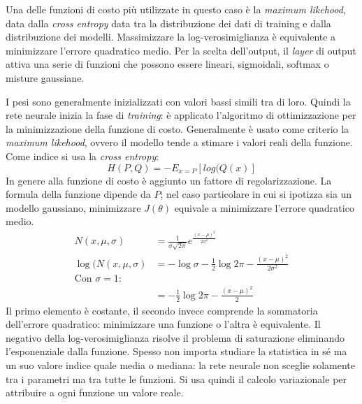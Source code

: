 \documentclass[11pt, a4page]{article}
\begin{document}
Una delle funzioni di costo più utilizzate in questo caso è la \textit{maximum likehood}, data dalla \textit{cross entropy} data tra la distribuzione dei dati di training e dalla distribuzione dei modelli.
Massimizzare la log-verosimiglianza è equivalente a minimizzare l'errore quadratico medio.
Per la scelta dell'output, il \textit{layer} di output attiva una serie di funzioni che possono essere lineari, sigmoidali, softmax o misture gaussiane.

I pesi sono generalmente inizializzati con valori bassi simili tra di loro.
Quindi la rete neurale inizia la fase di \textit{training}: è applicato l'algoritmo di ottimizzazione per la minimizzazione della funzione di costo.
Generalmente è usato come criterio la \textit{maximum likehood}, ovvero il modello tende a stimare i valori reali della funzione.
Come indice si usa la \textit{cross entropy}:
\begin{equation*}
  H(P, Q) = -E_{x=P}[log(Q(x)]
\end{equation*}
In genere alla funzione di costo è aggiunto un fattore di regolarizzazione.
La formula della funzione dipende da $P$; nel caso particolare in cui si ipotizza sia un modello gaussiano, minimizzare $J(\theta)$ equivale a minimizzare l'errore quadratico medio.
\begin{align*}
  N(x, \mu, \sigma) &= \frac{1}{\sigma\sqrt{2\pi}}e^{\frac{(x - \mu)^2}{2\sigma^2}} \\
  \log(N(x, \mu, \sigma) &= -\log \sigma - \frac{1}{2}\log 2\pi - \frac{(x - \mu)^2}{2 \sigma^2} \\
  \text{Con $\sigma = 1$:} \\
                    &= -\frac{1}{2} \log 2 \pi - \frac{(x - \mu)^2}{2}
\end{align*}
Il primo elemento è costante, il secondo invece comprende la sommatoria dell'errore quadratico: minimizzare una funzione o l'altra è equivalente.
Il negativo della log-verosimiglianza risolve il problema di saturazione eliminando l'esponenziale dalla funzione.
Spesso non importa studiare la statistica in sé ma un suo valore indice quale media o mediana: la rete neurale non sceglie solamente tra i parametri ma tra tutte le funzioni.
Si usa quindi il calcolo variazionale per attribuire a ogni funzione un valore reale.
\end{document}
